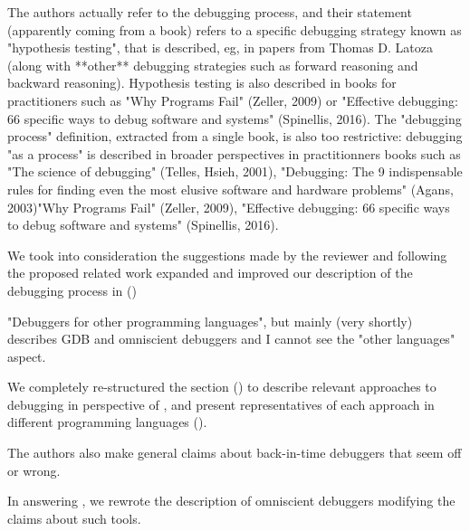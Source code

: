 \begin{remark} \label{rem:debugging-process}
The authors actually refer to the debugging process, and their statement (apparently coming from a book) refers to a specific debugging strategy known as "hypothesis testing", that is described, eg, in papers from Thomas D. Latoza (along with **other** debugging strategies such as forward reasoning and backward reasoning). Hypothesis testing is also described in books for practitioners such as "Why Programs Fail" (Zeller, 2009) or "Effective debugging: 66 specific ways to debug software and systems" (Spinellis, 2016). The "debugging process" definition, extracted from a single book, is also too restrictive: debugging "as a process" is described in broader perspectives in practitionners books such as "The science of debugging" (Telles, Hsieh, 2001), "Debugging: The 9 indispensable rules for finding even the most elusive software and hardware problems" (Agans, 2003)"Why Programs Fail" (Zeller, 2009), "Effective debugging: 66 specific ways to debug software and systems" (Spinellis, 2016).
\end{remark}
\begin{solved}
We took into consideration the suggestions made by the reviewer and following the proposed related work expanded and improved our description of the debugging process in  ()
\end{solved}

\begin{remark}\label{rem:other-langs}
"Debuggers for other programming languages", but mainly (very shortly) describes GDB and omniscient debuggers and I cannot see the "other languages" aspect.
\end{remark}
\begin{solved}
We completely re-structured the section () to describe relevant approaches to debugging in perspective of \flik, and present representatives of each approach in different programming languages ().
\end{solved}

\begin{remark}
The authors also make general claims about back-in-time debuggers that seem off or wrong.
\end{remark}
\begin{solved}
In answering , we rewrote the description of omniscient debuggers modifying the claims about such tools.
\end{solved}

